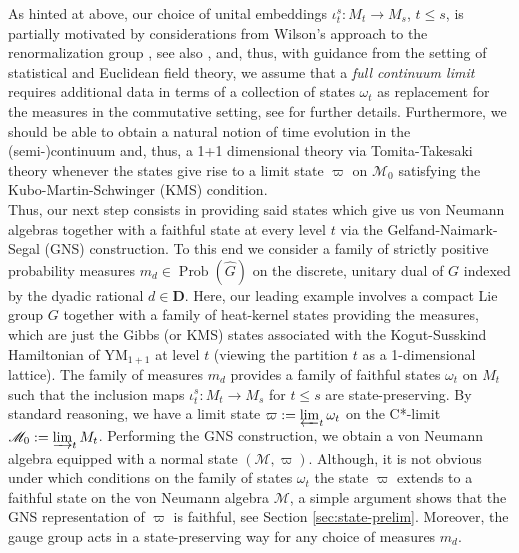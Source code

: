 \documentclass[a4paper,12pt]{amsart}
\numberwithin{equation}{section}
\theoremstyle{definition}
\newcommand{\D}{\mathbf D}
\newcommand{\scrM}{\mathscr M}
\DeclareMathOperator{\Prob}{Prob}
\newcommand{\wh}{\widehat}
\begin{document}
As hinted at above, our choice of unital embeddings $\iota_t^s:M_t\to M_s$, $t\leq s$, is partially motivated by considerations from Wilson's approach to the renormalization group \cite{Wilson-71-Renormalization1, Wilson-71-Renormalization2}, see also \cite{Fernandez-92-Random-Walks}, and, thus, with guidance from the setting of statistical and Euclidean field theory, we assume that a \textit{full continuum limit} requires additional data in terms of a collection of states $\omega_{t}$ as replacement for the measures in the commutative setting, see {\cite[Section 4]{Brot-Stottmeister-Phys}} for further details. Furthermore, we should be able to obtain a natural notion of time evolution in the (semi-)continuum and, thus, a 1+1 dimensional theory via Tomita-Takesaki theory whenever the states give rise to a limit state $\varpi$ on $\scrM_{0}$ satisfying the Kubo-Martin-Schwinger (KMS) condition.\\[0.1cm]
Thus, our next step consists in providing said states which give us von Neumann algebras together with a faithful state at every level $t$ via the Gelfand-Naimark-Segal (GNS) construction.
To this end we consider a family of strictly positive probability measures $m_d\in\Prob(\wh G)$ on the discrete, unitary dual of $G$ indexed by the dyadic rational $d\in\D$.
Here, our leading example involves a compact Lie group $G$ together with a family of heat-kernel states providing the measures, which are just the Gibbs (or KMS) states associated with the Kogut-Susskind Hamiltonian \cite{Kogut-Susskind75} of YM$_{1+1}$ at level $t$ (viewing the partition $t$ as a 1-dimensional lattice). The family of measures $m_d$ provides a family of faithful states $\omega_t$ on $M_t$ such that the inclusion maps $\iota_t^s:M_t\to M_s$ for $t\leq s$ are state-preserving. By standard reasoning, we have a limit state $\varpi:=\varprojlim_t \omega_t$ on the C*-limit $\scrM_0:=\varinjlim_t M_t$. Performing the GNS construction, we obtain a von Neumann algebra equipped with a normal state $(\scrM,\varpi)$. Although, it is not obvious under which conditions on the family of states $\omega_t$ the state $\varpi$ extends to a faithful state on the von Neumann algebra $\scrM$, a simple argument shows that the GNS representation of $\varpi$ is faithful, see Section \ref{sec:state-prelim}. 
Moreover, the gauge group acts in a state-preserving way for any choice of measures $m_d$.
\end{document}
